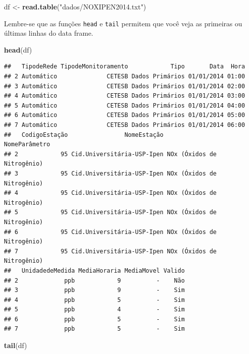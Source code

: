 \documentclass[]{book}
\newenvironment{Shaded}{\begin{snugshade}}{\end{snugshade}}
\newcommand{\KeywordTok}[1]{\textcolor[rgb]{0.13,0.29,0.53}{\textbf{#1}}}
\newcommand{\StringTok}[1]{\textcolor[rgb]{0.31,0.60,0.02}{#1}}
\newcommand{\NormalTok}[1]{#1}
\theoremstyle{definition}
\theoremstyle{definition}
\theoremstyle{definition}
\theoremstyle{remark}
\begin{document}
\begin{Shaded}
\begin{Highlighting}[]
\NormalTok{df <-}\StringTok{ }\KeywordTok{read.table}\NormalTok{(}\StringTok{"dados/NOXIPEN2014.txt"}\NormalTok{)}
\end{Highlighting}
\end{Shaded}

Lembre-se que as funções \texttt{head} e \texttt{tail} permitem que você
veja as primeiras ou últimas linhas do data frame.

\begin{Shaded}
\begin{Highlighting}[]
\KeywordTok{head}\NormalTok{(df)}
\end{Highlighting}
\end{Shaded}

\begin{verbatim}
##   TipodeRede TipodeMonitoramento            Tipo       Data  Hora
## 2 Automático              CETESB Dados Primários 01/01/2014 01:00
## 3 Automático              CETESB Dados Primários 01/01/2014 02:00
## 4 Automático              CETESB Dados Primários 01/01/2014 03:00
## 5 Automático              CETESB Dados Primários 01/01/2014 04:00
## 6 Automático              CETESB Dados Primários 01/01/2014 05:00
## 7 Automático              CETESB Dados Primários 01/01/2014 06:00
##   CodigoEstação                NomeEstação              NomeParâmetro
## 2            95 Cid.Universitária-USP-Ipen NOx (Óxidos de Nitrogênio)
## 3            95 Cid.Universitária-USP-Ipen NOx (Óxidos de Nitrogênio)
## 4            95 Cid.Universitária-USP-Ipen NOx (Óxidos de Nitrogênio)
## 5            95 Cid.Universitária-USP-Ipen NOx (Óxidos de Nitrogênio)
## 6            95 Cid.Universitária-USP-Ipen NOx (Óxidos de Nitrogênio)
## 7            95 Cid.Universitária-USP-Ipen NOx (Óxidos de Nitrogênio)
##   UnidadedeMedida MediaHoraria MediaMovel Valido
## 2             ppb            9          -    Não
## 3             ppb            9          -    Sim
## 4             ppb            5          -    Sim
## 5             ppb            4          -    Sim
## 6             ppb            5          -    Sim
## 7             ppb            5          -    Sim
\end{verbatim}

\begin{Shaded}
\begin{Highlighting}[]
\KeywordTok{tail}\NormalTok{(df)}
\end{Highlighting}
\end{Shaded}
\end{document}
